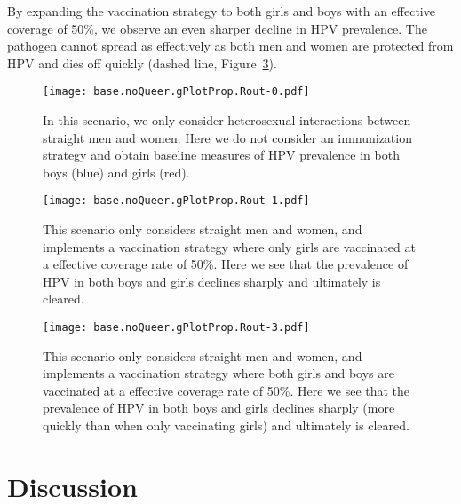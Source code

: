 \documentclass[12pt]{article}
\begin{document}
By expanding the vaccination strategy to both girls and boys with an effective coverage of 50\%, we observe an even sharper decline in HPV prevalence.  The pathogen cannot spread as effectively as both men and women are protected from HPV and dies off quickly (dashed line, Figure~\ref{fig:noQueerAllVacc50}).

\begin{figure}[h!]
\begin{center}
\texttt{[image: base.noQueer.gPlotProp.Rout-0.pdf]}
\caption{In this scenario, we only consider heterosexual interactions between straight men and women.  Here we do not consider an immunization strategy and obtain baseline measures of HPV prevalence in both boys (blue) and girls (red).}
\label{fig:noQueerNoVacc}
\end{center}
\end{figure}

\begin{figure}[h!]
\begin{center}
\texttt{[image: base.noQueer.gPlotProp.Rout-1.pdf]}
\caption{This scenario only considers straight men and women, and implements a vaccination strategy where only girls are vaccinated at a effective coverage rate of 50\%.  Here we see that the prevalence of HPV in both boys and girls declines sharply and ultimately is cleared.}
\label{fig:noQueerGirlVacc50}
\end{center}
\end{figure}

\begin{figure}[h!]
\begin{center}
\texttt{[image: base.noQueer.gPlotProp.Rout-3.pdf]}
\caption{This scenario only considers straight men and women, and implements a vaccination strategy where both girls and boys are vaccinated at a effective coverage rate of 50\%.  Here we see that the prevalence of HPV in both boys and girls declines sharply (more quickly than when only vaccinating girls) and ultimately is cleared.}
\label{fig:noQueerAllVacc50}
\end{center}
\end{figure}





\section{Discussion}
\end{document}
